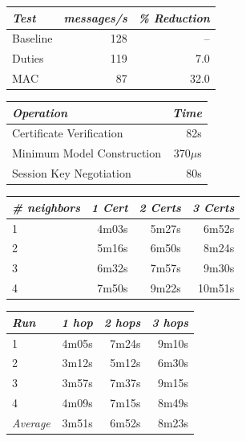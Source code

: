 \centering
  \begin{tabular}{|l|r|r|} \hline
    \textit{Test} \T & \textit{messages/s} & \textit{\% Reduction} \\
    \hline \hline

    Baseline \T & 128 &   -- \\ \hline 
    Duties   \T & 119 &  7.0 \\ \hline
    MAC      \T &  87 & 32.0 \\ \hline
  \end{tabular}
\stopslide


\centering
  \begin{tabular}{|l|r|} \hline
    \textit{Operation} \T & \textit{Time} \\ \hline \hline

    Certificate Verification     \T &  82s \\ \hline 
    Minimum Model Construction   \T & 370$\mu$s \\ \hline
    Session Key Negotiation      \T &  80s\\ \hline
  \end{tabular}
\stopslide


\centering
  \begin{tabular}{|l|r|r|r|} \hline
    \textit{\# neighbors} \T & \textit{1 Cert }
                             & \textit{2 Certs}
                             & \textit{3 Certs} \\ \hline \hline

    1 \T &  4m03s & 5m27s &  6m52s \\ \hline
    2 \T &  5m16s & 6m50s &  8m24s \\ \hline
    3 \T &  6m32s & 7m57s &  9m30s \\ \hline
    4 \T &  7m50s & 9m22s & 10m51s \\ \hline
  \end{tabular}
\stopslide


\centering
  \begin{tabular}{|l|r|r|r|} \hline
    \textit{Run} \T & \textit{1 hop }
                    & \textit{2 hops}
                    & \textit{3 hops} \\ \hline \hline

                   1 \T &  4m05s & 7m24s & 9m10s \\ \hline
                   2 \T &  3m12s & 5m12s & 6m30s \\ \hline
                   3 \T &  3m57s & 7m37s & 9m15s \\ \hline
                   4 \T &  4m09s & 7m15s & 8m49s \\ \hline
    \textit{Average} \T &  3m51s & 6m52s & 8m23s \\ \hline
  \end{tabular}
\stopslide

